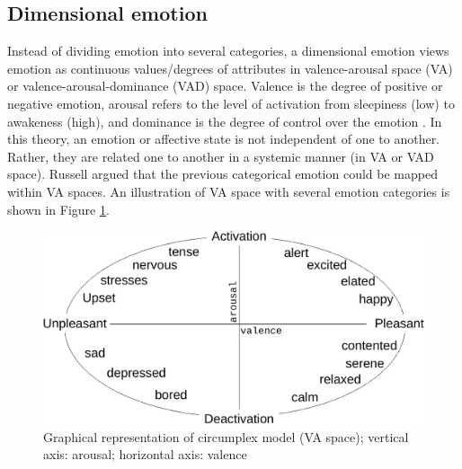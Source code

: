 

\subsection{Dimensional emotion}
Instead of dividing emotion into several categories, a dimensional emotion views
emotion as continuous values/degrees of attributes in valence-arousal space (VA)
or valence-arousal-dominance (VAD) space. Valence is the degree of positive or
negative emotion, arousal refers to the level of activation from sleepiness
(low) to awakeness (high), and dominance is the degree of control over the
emotion \cite{Gunes2010}. In this theory, an emotion or affective state is not
independent of one to another. Rather, they are related one to another in a
systemic manner (in VA or VAD space). Russell \cite{Russell1980} argued that the
previous categorical emotion could be mapped within VA spaces. An illustration
of VA space with several emotion categories is shown in Figure
\ref{fig:va_space}.  


\begin{figure}[htbp]
    \centering
    \includegraphics[width=.8\textwidth]{../fig/circumplex-crop.pdf}
\caption{Graphical representation of circumplex model (VA
space)\cite{Posner2005}; vertical axis: arousal; horizontal axis: valence}
    \label{fig:va_space}
\end{figure}

